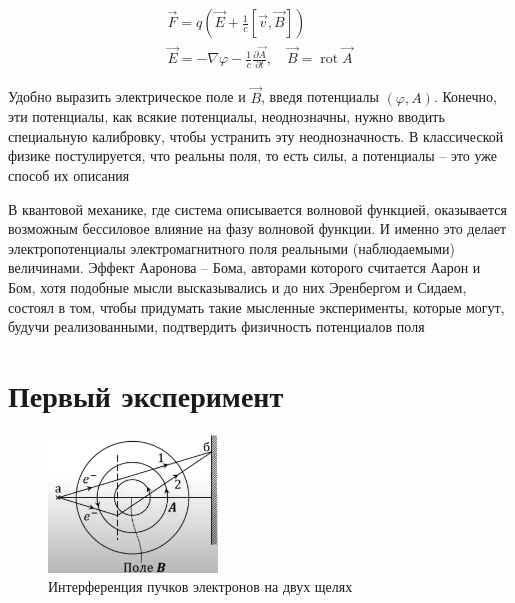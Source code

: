 \documentclass[a4paper, 14pt]{article}
\begin{document}
    \begin{gather}
        \vec{F} = q\left( \vec{E} + \frac{1}{c} [\vec{v}, \vec{B}] \right) \\
        \vec{E} = -\nabla \varphi - \frac{1}{c} \frac{\partial \vec{A}}{\partial t}, \quad \vec{B} =
        \operatorname{rot} \vec{A}
    \end{gather}
    
    Удобно выразить электрическое поле и $\vec{B}$, введя потенциалы $(\varphi, A)$.
    Конечно, эти потенциалы, как всякие потенциалы, неоднозначны, нужно вводить специальную калибровку, чтобы
    устранить эту неоднозначность.
    В классической физике постулируется, что реальны поля, то есть силы, а потенциалы -- это уже способ их описания
    
    В квантовой механике, где система описывается волновой функцией, оказывается возможным бессиловое влияние на
    фазу волновой функции.
    И именно это делает электропотенциалы электромагнитного поля реальными (наблюдаемыми) величинами.
    Эффект Ааронова -- Бома, авторами которого считается Аарон и Бом, хотя подобные мысли высказывались и до них
    Эренбергом и Сидаем, состоял в том, чтобы придумать такие мысленные эксперименты, которые могут, будучи
    реализованными, подтвердить физичность потенциалов поля
    
    \section*{Первый эксперимент} 
    
    \begin{figure}[h]
        \centering
        \includegraphics[width=0.4\textwidth]{exp1}
        \caption{Интерференция пучков электронов на двух щелях}
        \label{fig:exp1}
    \end{figure}
    
\end{document}
